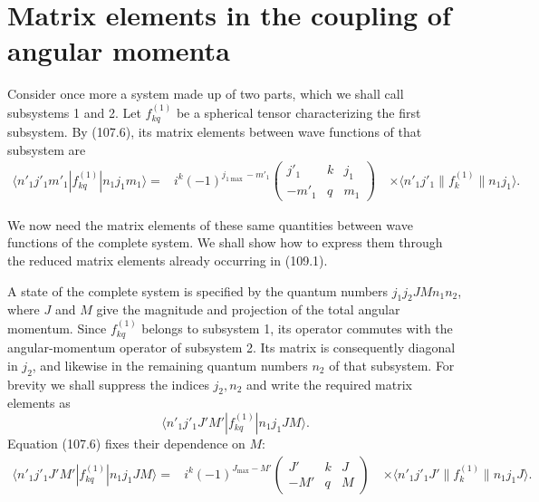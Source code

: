 \section{Matrix elements in the coupling of angular momenta}

Consider once more a system made up of two parts, which we shall call subsystems 1 and 2. Let $f_{kq}^{(1)}$ be a spherical tensor characterizing the first subsystem. By (107.6), its matrix elements between wave functions of that subsystem are
\begin{equation}
 \begin{aligned}
 \langle n'_1j'_1m'_1|f_{kq}^{(1)}|n_1j_1m_1\rangle
 ={}&i^k(-1)^{j_{1\max}-m'_1}
 \begin{pmatrix}j'_1&k&j_1\\-m'_1&q&m_1\end{pmatrix}\
 &\times\langle n'_1j'_1\|f_k^{(1)}\|n_1j_1\rangle.
 \end{aligned}
 \tag{109.1}
\end{equation}

We now need the matrix elements of these same quantities between wave functions of the complete system. We shall show how to express them through the reduced matrix elements already occurring in (109.1).

A state of the complete system is specified by the quantum numbers $j_1j_2JMn_1n_2$, where $J$ and $M$ give the magnitude and projection of the total angular momentum. Since $f_{kq}^{(1)}$ belongs to subsystem 1, its operator commutes with the angular-momentum operator of subsystem 2. Its matrix is consequently diagonal in $j_2$, and likewise in the remaining quantum numbers $n_2$ of that subsystem. For brevity we shall suppress the indices $j_2,n_2$ and write the required matrix elements as
\[
 \langle n'_1j'_1J'M'|f_{kq}^{(1)}|n_1j_1JM\rangle.
\]
Equation (107.6) fixes their dependence on $M$:
\begin{equation}
 \begin{aligned}
 \langle n'_1j'_1J'M'|f_{kq}^{(1)}|n_1j_1JM\rangle
 ={}&i^k(-1)^{J_{\max}-M'}
 \begin{pmatrix}J'&k&J\\-M'&q&M\end{pmatrix}\
 &\times\langle n'_1j'_1J'\|f_k^{(1)}\|n_1j_1J\rangle.
 \end{aligned}
 \tag{109.2}
\end{equation}

